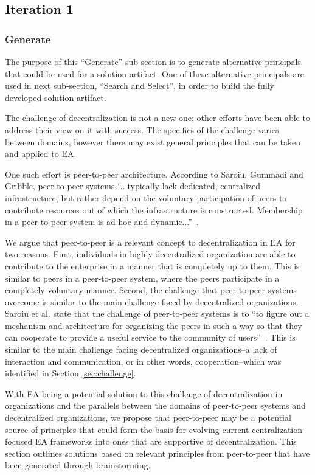 \subsection{Iteration 1}

\subsubsection*{Generate}

The purpose of this ``Generate'' sub-section is to generate alternative principals that could be used for a solution artifact. One of these alternative principals are used in next sub-section, ``Search and Select'', in order to build the fully developed solution artifact. 

The challenge of decentralization is not a new one; other efforts have been able to address their view on it with success. The specifics of the challenge varies between domains, however there may exist general principles that can be taken and applied to EA. 

One such effort is peer-to-peer architecture. According to Saroiu, Gummadi and Gribble, peer-to-peer systems ``...typically lack dedicated, centralized infrastructure, but rather depend on the voluntary participation of peers to contribute resources out of which the infrastructure is constructed. Membership in a peer-to-peer system is ad-hoc and dynamic...''~\cite{saroiu2001measurement}. 

We argue that peer-to-peer is a relevant concept to decentralization in EA for two reasons. First, individuals in highly decentralized organization are able to contribute to the enterprise in a manner that is completely up to them. This is similar to peers in a peer-to-peer system, where the peers participate in a completely voluntary manner. Second, the challenge that peer-to-peer systems overcome is similar to the main challenge faced by decentralized organizations. Saroiu et al. state that the challenge of peer-to-peer systems is to ``to figure out a mechanism and architecture for organizing the peers in such a way so that they can cooperate to provide a useful service to the community of users''~\cite{saroiu2001measurement}. This is similar to the main challenge facing decentralized organizations--a lack of interaction and communication, or in other words, cooperation--which was identified in Section \ref{sec:challenge}. 

With EA being a potential solution to this challenge of decentralization in organizations and the parallels between the domains of peer-to-peer systems and decentralized organizations, we propose that peer-to-peer may be a potential source of principles that could form the basis for evolving current centralization-focused EA frameworks into ones that are supportive of decentralization. This section outlines solutions based on relevant principles from peer-to-peer that have been generated through brainstorming.

